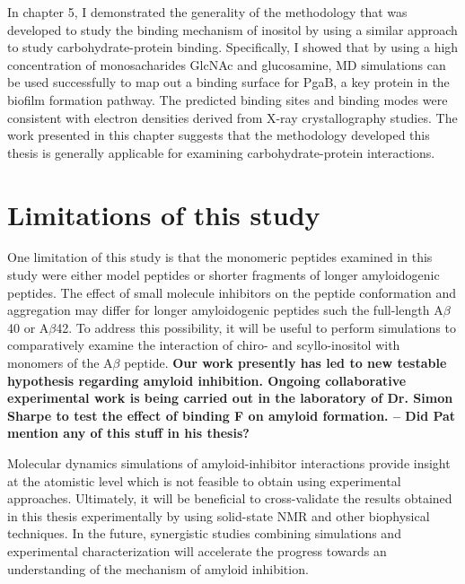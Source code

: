In chapter 5, I demonstrated the generality of the methodology that was developed to study the binding mechanism of inositol by using a similar approach to study carbohydrate-protein binding. Specifically, I showed that by using a high concentration of monosacharides GlcNAc and glucosamine, MD simulations can be used successfully to map out a binding surface for PgaB, a key protein in the biofilm formation pathway. The predicted binding sites and binding modes were consistent with electron densities derived from X-ray crystallography studies.  The work presented in this chapter suggests that the methodology developed this thesis is generally applicable for examining carbohydrate-protein interactions.

\section{Limitations of this study}

One limitation of this study is that the monomeric peptides examined in this study were either model peptides or shorter fragments of longer amyloidogenic peptides. The effect of small molecule inhibitors on the peptide conformation and aggregation may differ for longer amyloidogenic peptides such the full-length A$\beta$40 or A$\beta$42. To address this possibility, it will be useful to perform simulations to comparatively examine the interaction of chiro- and scyllo-inositol with monomers of the A$\beta$ peptide.
\textbf{Our work presently has led to new testable hypothesis regarding amyloid inhibition. Ongoing collaborative experimental work is being carried out in the laboratory of Dr. Simon Sharpe to test the effect of binding F on amyloid formation. -- Did Pat mention any of this stuff in his thesis?}

Molecular dynamics simulations of amyloid-inhibitor interactions provide insight at the atomistic level which is not feasible to obtain using experimental approaches.  Ultimately, it will be beneficial to cross-validate the results obtained in this thesis experimentally by using solid-state NMR and other biophysical techniques. In the future, synergistic studies combining simulations and experimental characterization will accelerate the progress towards an understanding of the mechanism of amyloid inhibition.   

